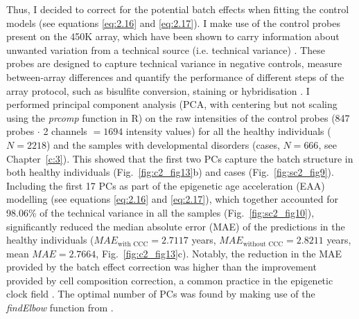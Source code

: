 Thus, I decided to correct for the potential batch effects when fitting the control models (see equations \ref{eq:2.16} and \ref{eq:2.17}). I make use of the control probes present on the 450K array, which have been shown to carry information about unwanted variation from a technical source (i.e. technical variance)  \cite{Maksimovic2015,Fortin2014,Gagnon-Bartsch2012}. These probes are designed to capture technical variance in negative controls, measure between-array differences and quantify the performance of different steps of the array protocol, such as bisulfite conversion, staining or hybridisation \cite{Fortin2014,Illumina2010}. I performed principal component analysis (PCA, with centering but not scaling using the \textit{prcomp} function in R) on the raw intensities of the control probes (847 probes $\cdot$ 2 channels $= 1694$ intensity values) for all the healthy individuals ($N=2218$) and the samples with developmental disorders (cases, $N=666$, see Chapter~\ref{c:3}). This showed that the first two PCs capture the batch structure in both healthy individuals (Fig.~\ref{fig:c2_fig13}b) and cases (Fig.~\ref{fig:sc2_fig9}). Including the first 17 PCs as part of the epigenetic age acceleration (EAA) modelling (see equations \ref{eq:2.16} and \ref{eq:2.17}), which together accounted for 98.06\% of the technical variance in all the samples (Fig.~\ref{fig:sc2_fig10}), significantly reduced the median absolute error (MAE) of the predictions in the healthy individuals ($MAE_{\text{with CCC}} = 2.7117$ years, $MAE_{\text{without CCC}} = 2.8211$ years, mean $MAE = 2.7664$, Fig.~\ref{fig:c2_fig13}c). Notably, the reduction in the MAE provided by the batch effect correction was higher than the improvement provided by cell composition correction, a common practice in the epigenetic clock field \cite{Horvath2016, Chen2016}. The optimal number of PCs was found by making use of the \textit{findElbow} function from \cite{Akalin2014}. 

